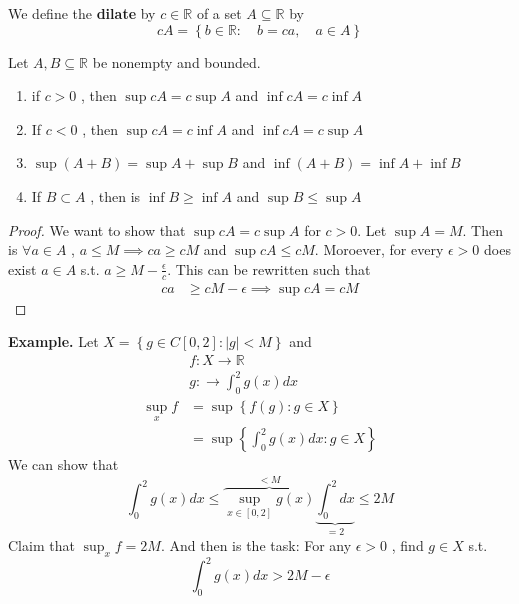 \documentclass{article}
\theoremstyle{remark}
\begin{document}
\begin{definition}
We define the \textbf{dilate}  by $ c \in  \mathbb{R} $ of a set $A \subseteq  \mathbb{R} $  by \[
cA = \left\{  b \in  \mathbb{R} : \quad  b = ca , \quad  a \in A   \right\}
\] 
\end{definition}

\begin{lemma}
  Let $A, B \subseteq  \mathbb{R} $ be nonempty and bounded. 
  \begin{enumerate}
    \item if $c > 0$ , then $\sup cA = c \sup A$  and $\inf cA = c \inf A$
    \item If $ c < 0$ , then $\sup  cA = c \inf A$  and $ \inf cA = c\sup A$
    \item $\sup \left( A +B \right) = \sup A + \sup  B $  and $\inf \left( A + B \right) = \inf A + \inf B$
    \item If $ B \subset  A$ , then is $ \inf B \ge \inf A$ and $\sup B \le \sup A$
   \end{enumerate}
  
\end{lemma}

\begin{proof}
  We want to show that $\sup cA = c \sup A$ for $c > 0$.  Let $\sup  A = M$. Then is $\forall a \in  A$ , $a \le M \implies  ca \ge cM$ and $\sup  cA \le cM$. Moroever, for every $\epsilon  > 0$  does exist $a \in  A$ s.t. $a \ge M - \frac{\epsilon}{c}$. This can be rewritten such that \[
  \begin{split}
     ca   & \ge cM - \epsilon    
     \implies  \sup cA =  cM 
  \end{split} 
  \]  
\end{proof}
 \begin{tcolorbox}
   \textbf{Example.} Let $X = \left\{ g \in  C\left[ 0,2 \right]: \left| g \right| < M \right\}$ and  \[
   \begin{split}
       & f: X \to  \mathbb{R}   \\
        & g: \to  \int_{0}^{2}  g\left( x \right)dx \\
           \sup _{x}f &= \sup  \left\{ f\left( g \right) : g \in  X \right\}  \\
         &=  \sup \left\{ \int_{0}^{2}  g\left( x \right)dx:  g \in  X  \right\} 
   \end{split} 
   \] 
   We can show that \[
     \int_{0}^{2}  g\left( x \right)dx  \le \overbrace{ \sup _{x \in  \left[ 0,2 \right] } g\left( x \right) }^{< M} \underbrace{\int_{0}^{2} dx }_{= 2} \le 2M
   \] 
   Claim that $\sup _{x} f = 2M$. And then is the task: For any $ \epsilon  > 0$ , find $g \in X$ s.t. \[
   \int_{0}^{2} g\left( x \right)dx > 2M - \epsilon  
   \] 
 \end{tcolorbox}
\end{document}
